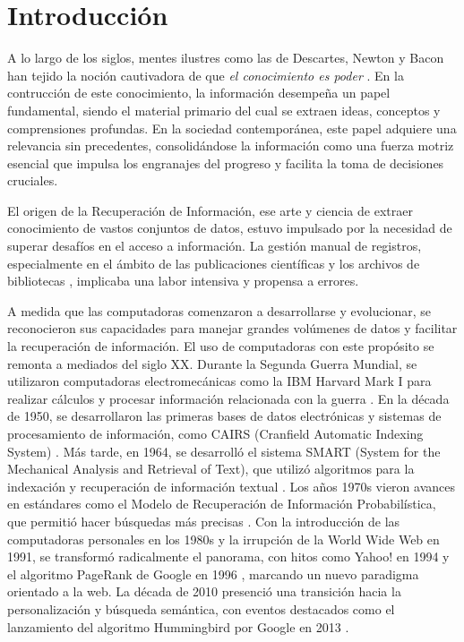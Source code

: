 \chapter*{Introducción}\label{chapter:introduction}

A lo largo de los siglos, mentes ilustres como las de Descartes, Newton y Bacon han tejido la noción cautivadora de que \textit{el conocimiento es poder} . En la contrucci\'on de este conocimiento, la información desempeña un papel fundamental, siendo el material primario del cual se extraen ideas, conceptos y comprensiones profundas. En la sociedad contemporánea, este papel adquiere una relevancia sin precedentes, consolidándose la información como una fuerza motriz esencial que impulsa los engranajes del progreso y facilita la toma de decisiones cruciales.

El origen de la Recuperación de Información, ese arte y ciencia de extraer conocimiento de vastos conjuntos de datos, estuvo impulsado por la necesidad de superar desafíos en el acceso a información. La gestión manual de registros, especialmente en el ámbito de las publicaciones científicas y los archivos de bibliotecas , implicaba una labor intensiva y propensa a errores.

A medida que las computadoras comenzaron a desarrollarse y evolucionar, se reconocieron sus capacidades para manejar grandes vol\'umenes de datos y facilitar la recuperación de información. El uso de computadoras con este prop\'osito se remonta a mediados del siglo XX. Durante la Segunda Guerra Mundial, se utilizaron computadoras electromecánicas como la IBM Harvard Mark I para realizar cálculos y procesar información relacionada con la guerra . En la década de 1950, se desarrollaron las primeras bases de datos electrónicas y sistemas de procesamiento de información, como CAIRS (Cranfield Automatic Indexing System) . M\'as tarde, en 1964, se desarrolló el sistema SMART (System for the Mechanical Analysis and Retrieval of Text), que utilizó algoritmos para la indexación y recuperación de información textual . Los a\~nos 1970s vieron avances en estándares como el Modelo de Recuperación de Información Probabilística, que permiti\'o hacer b\'usquedas m\'as precisas . Con la introducción de las computadoras personales en los 1980s  y la irrupción de la World Wide Web en 1991,  se transformó radicalmente el panorama, con hitos como Yahoo! en 1994  y el algoritmo PageRank de Google en 1996 , marcando un nuevo paradigma orientado a la web. La década de 2010 presenció una transición hacia la personalización y búsqueda semántica, con eventos destacados como el lanzamiento del algoritmo Hummingbird por Google en 2013 . 

